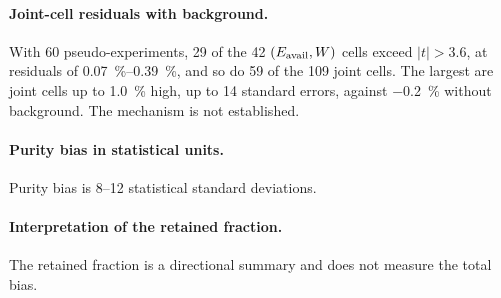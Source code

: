 \paragraph{Joint-cell residuals with background.} With 60 pseudo-experiments, 29 of the 42 $(E_{\mathrm{avail}},W)$ cells exceed $|t|>3.6$, at residuals of \SIrange{0.07}{0.39}{\percent}, and so do 59 of the 109 joint cells. The largest are joint cells up to \SI{1.0}{\percent} high, up to 14 standard errors, against \SI{-0.2}{\percent} without background. The mechanism is not established.

\paragraph{Purity bias in statistical units.} Purity bias is 8--12 statistical standard deviations.

\paragraph{Interpretation of the retained fraction.} The retained fraction is a directional summary and does not measure the total bias.


